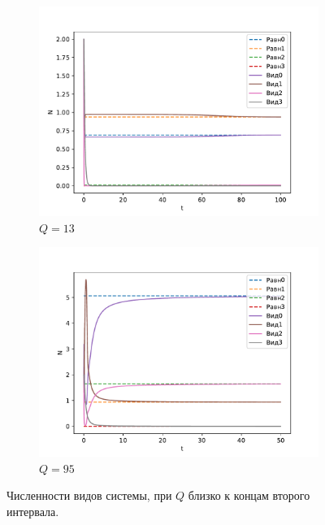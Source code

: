     \begin{figure}[H]
        \centering
        \begin{subfigure}[t]{.45\linewidth}
            \centering
            \includegraphics[width=\textwidth]{pictures/exp_flow/exp1_Q13.pdf}
            \caption{\(Q = 13\)}
        \end{subfigure}
        \begin{subfigure}[t]{.45\linewidth}
              \centering
              \includegraphics[width=\textwidth]{pictures/exp_flow/exp1_Q95.pdf}
              \caption{\(Q = 95\)}
            \end{subfigure}
        \caption{Численности видов системы, при \(Q\) близко к концам второго интервала.}  \label{fig:flow_exp1_q2}
    \end{figure}
    
